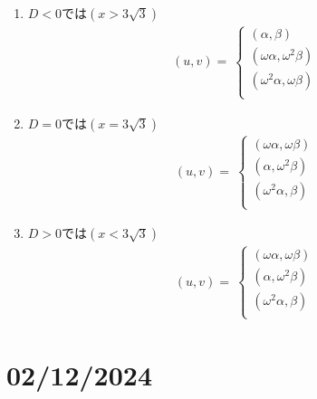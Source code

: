 \documentclass[dvipdfmx]{report} %
\begin{document}
\begin{enumerate}[(1)\,]
\item{$D < 0 $では$(x > 3 \sqrt{3})$}
\begin{equation*}
\begin{split}
	( u, v ) =\
		\begin{cases}
			( \alpha, \beta )\\
			( \omega\alpha, \omega^2 \beta )\\
			( \omega^2 \alpha, \omega\beta )\\
		\end{cases}
\end{split}
\end{equation*}

\item{$D = 0 $では$(x = 3 \sqrt{3})$}
\begin{equation*}
\begin{split}
	( u, v ) =\
		\begin{cases}
			( \omega\alpha, \omega\beta )\\
			( \alpha, \omega^2 \beta )\\
			( \omega^2 \alpha, \beta )\\
		\end{cases}
\end{split}
\end{equation*}

\item{$D > 0 $では$(x < 3 \sqrt{3})$}
\begin{equation*}
\begin{split}
	( u, v ) =\
		\begin{cases}
			( \omega\alpha, \omega\beta )\\
			( \alpha, \omega^2 \beta )\\
			( \omega^2 \alpha, \beta )\\
		\end{cases}
\end{split}
\end{equation*}
\end{enumerate}

\chapter{02/12/2024}
\end{document}
